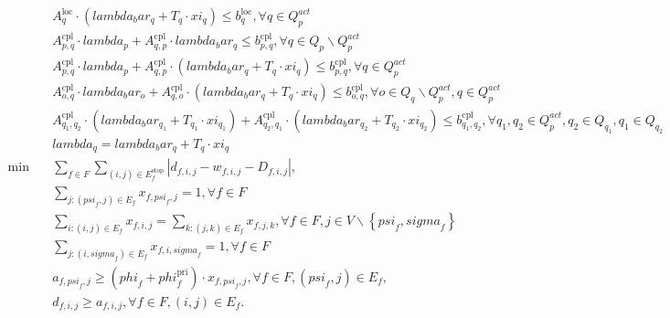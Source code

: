 \begin{align}
  & A_{q}^{\text{loc}} \cdot \left(lambda_bar_{q} + T_{q} \cdot \mathit{xi}_{q}\right) \leq b_{q}^{\text{loc}} , \forall q \in Q_{p}^{act} \tag{eq\_0027} \\
  & A_{p , q}^{\text{cpl}} \cdot \mathit{lambda}_{p} + A_{q , p}^{\text{cpl}} \cdot lambda_bar_{q} \leq b_{p , q}^{\text{cpl}} , \forall q \in Q_{p} \backslash Q_{p}^{act} \tag{eq\_0028} \\
  & A_{p , q}^{\text{cpl}} \cdot \mathit{lambda}_{p} + A_{q , p}^{\text{cpl}} \cdot \left(lambda_bar_{q} + T_{q} \cdot \mathit{xi}_{q}\right) \leq b_{p , q}^{\text{cpl}} , \forall q \in Q_{p}^{act} \tag{eq\_0029} \\
  & A_{o , q}^{\text{cpl}} \cdot lambda_bar_{o} + A_{q , o}^{\text{cpl}} \cdot \left(lambda_bar_{q} + T_{q} \cdot \mathit{xi}_{q}\right) \leq b_{o , q}^{\text{cpl}} , \forall o \in Q_{q} \backslash Q_{p}^{act} , q \in Q_{p}^{act} \tag{eq\_0030} \\
  &  A_{q_{1} , q_{2}}^{\text{cpl}} \cdot \left(lambda_bar_{q_{1}} + T_{q_{1}} \cdot \mathit{xi}_{q_{1}}\right) + A_{q_{2} , q_{1}}^{\text{cpl}} \cdot \left(lambda_bar_{q_{2}} + T_{q_{2}} \cdot \mathit{xi}_{q_{2}}\right) \leq b_{q_{1} , q_{2}}^{\text{cpl}} , \forall q_{1} , q_{2} \in Q_{p}^{act} , q_{2} \in Q_{q_{1}} , q_{1} \in Q_{q_{2}}  \tag{eq\_0031} \\
  & \mathit{lambda}_{q} = lambda_bar_{q} + T_{q} \cdot \mathit{xi}_{q} \tag{eq\_0032} \\
  \min\quad & \sum_{f \in F} \underset{\left(i , j\right) \in E_{f}^{\text{stop}}}{\sum} \left|d_{f , i , j} - w_{f , i , j} - D_{f , i , j}\right| , \tag{eq\_0033} \\
  & \sum_{j : \left(\mathit{psi}_{f} , j\right) \in E_{f}} x_{f , \mathit{psi}_{f} , j} = 1 , \forall f \in F \tag{eq\_0034} \\
  & \sum_{i : \left(i , j\right) \in E_{f}} x_{f , i , j} = \sum_{k : \left(j , k\right) \in E_{f}} x_{f , j , k} , \forall f \in F , j \in V \backslash \left\{\mathit{psi}_{f} , \mathit{sigma}_{f}\right\} \tag{eq\_0035} \\
  & \sum_{j : \left(i , \mathit{sigma}_{f}\right) \in E_{f}} x_{f , i , \mathit{sigma}_{f}} = 1 , \forall f \in F \tag{eq\_0036} \\
  & a_{f , \mathit{psi}_{f} , j} \geq \left(\mathit{phi}_{f} + \mathit{phi}_{f}^{\text{pri}}\right) \cdot x_{f , \mathit{psi}_{f} , j} , \forall f \in F , \left(\mathit{psi}_{f} , j\right) \in E_{f} , \tag{eq\_0037} \\
  & d_{f , i , j} \geq a_{f , i , j} , \forall f \in F , \left(i , j\right) \in E_{f} . \tag{eq\_0038} \\

\end{align}

